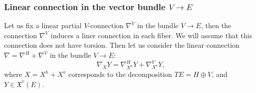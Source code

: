 \documentclass[12pt,letterpaper]{amsart}
\theoremstyle{definition}
\theoremstyle{plain}
\theoremstyle{remark}
\begin{document}
\subsubsection{Linear connection in the vector bundle $V \to E$}
\label{subsubsec:3_2_2}
Let us fix a linear partial $V$-connection $\nabla^V$ in the bundle $V \to E$, then the connection $\nabla^V$ induces a liner connection in each fiber.
We will assume that this connection does not have torsion.
Then let us consider the linear connection $\nabla = \nabla^H + \nabla^V$ in the bundle $V \to E$:
\begin{equation}
\nabla_X Y = \nabla^H_{X^h} Y + \nabla^V_{X^v} Y,
\label{eq:19}
\end{equation}
where $X = X^h + X^v$ corresponds to the decomposition $TE = H \oplus V$, and $Y \in \mathfrak{X}^v(E)$.
\end{document}
